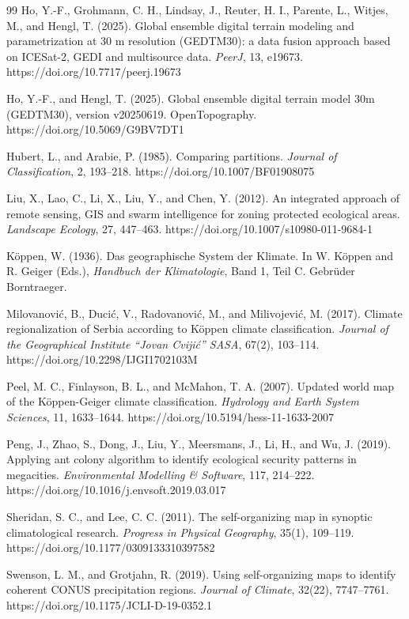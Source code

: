 \documentclass[11pt]{article}
\begin{document}
\begin{thebibliography}{99}
Ho, Y.-F., Grohmann, C. H., Lindsay, J., Reuter, H. I., Parente, L., Witjes, M., and Hengl, T. (2025).
Global ensemble digital terrain modeling and parametrization at 30 m resolution (GEDTM30): a data fusion approach based on ICESat-2, GEDI and multisource data.
\textit{PeerJ}, 13, e19673.
https://doi.org/10.7717/peerj.19673

Ho, Y.-F., and Hengl, T. (2025).
Global ensemble digital terrain model 30m (GEDTM30), version v20250619.
OpenTopography.
https://doi.org/10.5069/G9BV7DT1

Hubert, L., and Arabie, P. (1985).
Comparing partitions.
\textit{Journal of Classification}, 2, 193--218.
https://doi.org/10.1007/BF01908075

Liu, X., Lao, C., Li, X., Liu, Y., and Chen, Y. (2012).
An integrated approach of remote sensing, GIS and swarm intelligence for zoning protected ecological areas.
\textit{Landscape Ecology}, 27, 447--463.
https://doi.org/10.1007/s10980-011-9684-1

Köppen, W. (1936).
Das geographische System der Klimate.
In W. Köppen and R. Geiger (Eds.), \textit{Handbuch der Klimatologie}, Band 1, Teil C.
Gebrüder Borntraeger.

Milovanović, B., Ducić, V., Radovanović, M., and Milivojević, M. (2017).
Climate regionalization of Serbia according to Köppen climate classification.
\textit{Journal of the Geographical Institute ``Jovan Cvijić'' SASA}, 67(2), 103--114.
https://doi.org/10.2298/IJGI1702103M

Peel, M. C., Finlayson, B. L., and McMahon, T. A. (2007).
Updated world map of the Köppen-Geiger climate classification.
\textit{Hydrology and Earth System Sciences}, 11, 1633--1644.
https://doi.org/10.5194/hess-11-1633-2007

Peng, J., Zhao, S., Dong, J., Liu, Y., Meersmans, J., Li, H., and Wu, J. (2019).
Applying ant colony algorithm to identify ecological security patterns in megacities.
\textit{Environmental Modelling \& Software}, 117, 214--222.
https://doi.org/10.1016/j.envsoft.2019.03.017

Sheridan, S. C., and Lee, C. C. (2011).
The self-organizing map in synoptic climatological research.
\textit{Progress in Physical Geography}, 35(1), 109--119.
https://doi.org/10.1177/0309133310397582

Swenson, L. M., and Grotjahn, R. (2019).
Using self-organizing maps to identify coherent CONUS precipitation regions.
\textit{Journal of Climate}, 32(22), 7747--7761.
https://doi.org/10.1175/JCLI-D-19-0352.1


\end{thebibliography}
\end{document}
